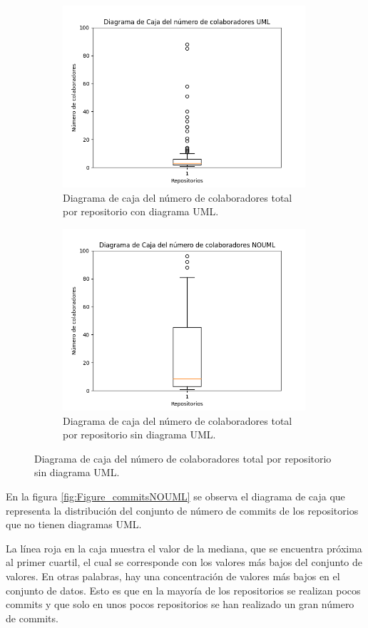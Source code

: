 \documentclass[a4paper, 12pt]{book}
\begin{document}
\begin{figure}
  \centering
  \begin{subfigure}{0.45\linewidth}
    \centering
    \includegraphics[width=9cm, keepaspectratio]{img/Figure_contributorsUML.png}
    \caption{Diagrama de caja del número de colaboradores total por repositorio con diagrama UML. }\label{fig:Figure_contributorsUML.png}
  \end{subfigure}
  \hfill
    \begin{subfigure}{0.45\linewidth}
      \centering
      \includegraphics[width=9cm, keepaspectratio]{img/Figure_contributorsNOUML.png}
      \caption{Diagrama de caja del número de colaboradores total por repositorio sin diagrama UML.}\label{fig:Figure_contributorsNOUML}
  \end{subfigure}
\end{figure}



En la figura \ref{fig:Figure_commitsNOUML} se observa el diagrama de caja que representa la distribución del conjunto de número de commits de los repositorios que no tienen diagramas UML.


La línea roja en la caja muestra el valor de la mediana, que se encuentra próxima al primer cuartil, el cual se corresponde con los valores más bajos del conjunto de valores. 
En otras palabras, hay una concentración de valores más bajos en el conjunto de datos. 
Esto es que en la mayoría de los repositorios se realizan pocos commits y que solo en unos pocos repositorios se han realizado un gran número de commits.
\end{document}
